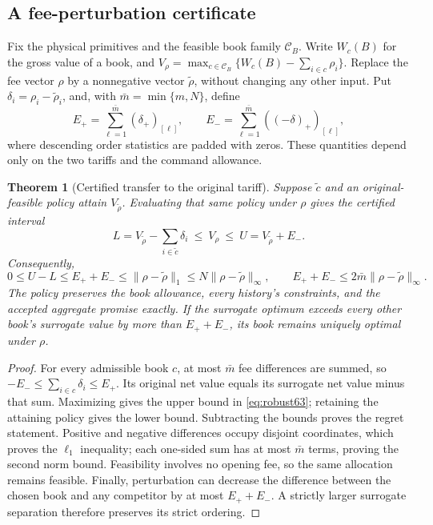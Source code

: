\documentclass[11pt,letterpaper]{article}
\newtheorem{theorem}{Theorem}[section]
\theoremstyle{definition}\newtheorem{remark}[theorem]{Remark}
\begin{document}
\subsection{A fee-perturbation certificate}
Fix the physical primitives and the feasible book family $\mathcal C_B$. Write $W_c(B)$ for the gross value of a book, and $V_\rho=\max_{c\in\mathcal C_B}\{W_c(B)-\sum_{i\in c}\rho_i\}$. Replace the fee vector $\rho$ by a nonnegative vector $\widetilde\rho$, without changing any other input. Put $\delta_i=\rho_i-\widetilde\rho_i$, and, with $\bar m=\min\{m,N\}$, define
\[
 E_+=\sum_{\ell=1}^{\bar m}(\delta_+)_{[\ell]},\qquad
 E_-=\sum_{\ell=1}^{\bar m}((-\delta)_+)_{[\ell]},
\]
where descending order statistics are padded with zeros. These quantities depend only on the two tariffs and the command allowance.
\begin{theorem}[Certified transfer to the original tariff]\label{thm:robust63}
Suppose $\widetilde c$ and an original-feasible policy attain $V_{\widetilde\rho}$. Evaluating that same policy under $\rho$ gives the certified interval
\begin{equation}\label{eq:robust63}
 L=V_{\widetilde\rho}-\sum_{i\in\widetilde c}\delta_i
 \ \leq\ V_\rho\ \leq\ U=V_{\widetilde\rho}+E_-.
\end{equation}
Consequently,
\[
 0\leq U-L\leq E_++E_-\leq\|\rho-\widetilde\rho\|_1
 \leq N\|\rho-\widetilde\rho\|_\infty,
 \qquad E_++E_-\leq2\bar m\|\rho-\widetilde\rho\|_\infty.
\]
The policy preserves the book allowance, every history's constraints, and the accepted aggregate promise exactly. If the surrogate optimum exceeds every other book's surrogate value by more than $E_++E_-$, its book remains uniquely optimal under $\rho$.
\end{theorem}
\begin{proof}
For every admissible book $c$, at most $\bar m$ fee differences are summed, so
$-E_-\leq\sum_{i\in c}\delta_i\leq E_+$. Its original net value equals its surrogate net value minus that sum. Maximizing gives the upper bound in \eqref{eq:robust63}; retaining the attaining policy gives the lower bound. Subtracting the bounds proves the regret statement. Positive and negative differences occupy disjoint coordinates, which proves the $\ell_1$ inequality; each one-sided sum has at most $\bar m$ terms, proving the second norm bound. Feasibility involves no opening fee, so the same allocation remains feasible. Finally, perturbation can decrease the difference between the chosen book and any competitor by at most $E_++E_-$. A strictly larger surrogate separation therefore preserves its strict ordering.
\end{proof}
\end{document}
